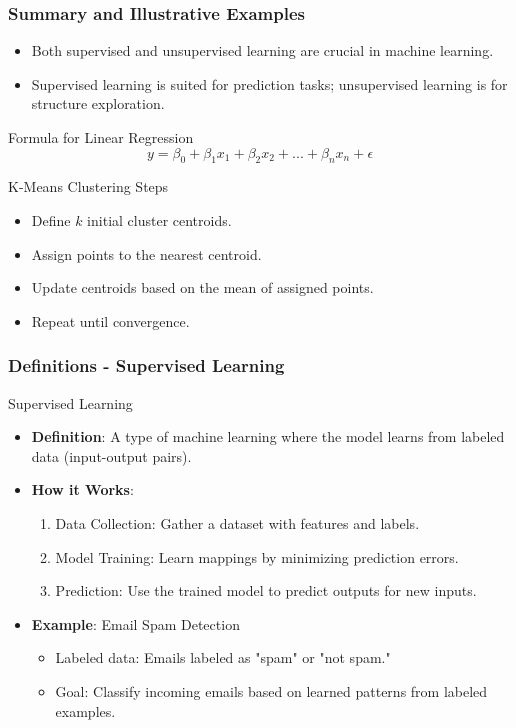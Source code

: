 \documentclass[aspectratio=169]{beamer}
\begin{document}
\begin{frame}[fragile]
    \frametitle{Summary and Illustrative Examples}
    \begin{itemize}
        \item Both supervised and unsupervised learning are crucial in machine learning.
        \item Supervised learning is suited for prediction tasks; unsupervised learning is for structure exploration. 
    \end{itemize}
    \begin{block}{Formula for Linear Regression}
        \begin{equation}
            y = \beta_0 + \beta_1 x_1 + \beta_2 x_2 + ... + \beta_n x_n + \epsilon
        \end{equation}
    \end{block}
    \begin{block}{K-Means Clustering Steps}
        \begin{itemize}
            \item Define $k$ initial cluster centroids.
            \item Assign points to the nearest centroid.
            \item Update centroids based on the mean of assigned points.
            \item Repeat until convergence.
        \end{itemize}
    \end{block}
\end{frame}

\begin{frame}[fragile]
    \frametitle{Definitions - Supervised Learning}
    \begin{block}{Supervised Learning}
        \begin{itemize}
            \item \textbf{Definition}: A type of machine learning where the model learns from labeled data (input-output pairs).
            \item \textbf{How it Works}:
                \begin{enumerate}
                    \item Data Collection: Gather a dataset with features and labels.
                    \item Model Training: Learn mappings by minimizing prediction errors.
                    \item Prediction: Use the trained model to predict outputs for new inputs.
                \end{enumerate}
            \item \textbf{Example}: Email Spam Detection
                \begin{itemize}
                    \item Labeled data: Emails labeled as "spam" or "not spam."
                    \item Goal: Classify incoming emails based on learned patterns from labeled examples.
                \end{itemize}
        \end{itemize}
    \end{block}
\end{frame}
\end{document}
